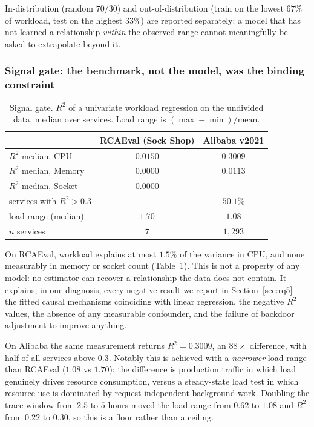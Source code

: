 \documentclass[journal, 10pt]{IEEEtran}
\begin{document}
In-distribution (random $70/30$) and out-of-distribution (train on the lowest
$67\%$ of workload, test on the highest $33\%$) are reported separately: a model
that has not learned a relationship \emph{within} the observed range cannot
meaningfully be asked to extrapolate beyond it.

\subsubsection{Signal gate: the benchmark, not the model, was the binding constraint}
\label{sec:rq4-gate}

\begin{table}[!t]
\centering
\caption{Signal gate. $R^2$ of a univariate workload regression on the undivided
data, median over services. Load range is $(\max-\min)/\mathrm{mean}$.}
\label{tab:signal-gate}
\begin{tabular}{lcc}
\toprule
 & RCAEval (Sock Shop) & Alibaba v2021 \\
\midrule
$R^2$ median, CPU     & $0.0150$ & $\mathbf{0.3009}$ \\
$R^2$ median, Memory  & $0.0000$ & $0.0113$ \\
$R^2$ median, Socket  & $0.0000$ & --- \\
services with $R^2>0.3$ & --- & $\mathbf{50.1\%}$ \\
load range (median)   & $1.70$ & $1.08$ \\
$n$ services          & $7$ & $1{,}293$ \\
\bottomrule
\end{tabular}
\end{table}

On RCAEval, workload explains at most $1.5\%$ of the variance in CPU, and none
measurably in memory or socket count (Table~\ref{tab:signal-gate}). This is not a property of any model:
no estimator can recover a relationship the data does not contain. It explains,
in one diagnosis, every negative result we report in Section~\ref{sec:rq5} ---
the fitted causal mechanisms coinciding with linear regression, the negative
$R^2$ values, the absence of any measurable confounder, and the failure of
backdoor adjustment to improve anything.

On Alibaba the same measurement returns $R^2=0.3009$, an $88{\times}$ difference,
with half of all services above $0.3$. Notably this is achieved with a
\emph{narrower} load range than RCAEval ($1.08$ vs $1.70$): the difference is
production traffic in which load genuinely drives resource consumption, versus a
steady-state load test in which resource use is dominated by request-independent
background work. Doubling the trace window from $2.5$ to $5$ hours moved the
load range from $0.62$ to $1.08$ and $R^2$ from $0.22$ to $0.30$, so this is a
floor rather than a ceiling.
\end{document}
